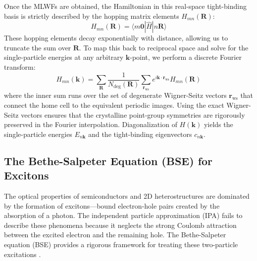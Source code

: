 \documentclass[11pt, a4paper]{article}
\begin{document}
Once the MLWFs are obtained, the Hamiltonian in this real-space tight-binding basis is strictly described by the hopping matrix elements $H_{mn}(\mathbf{R})$:
\begin{equation}
    H_{mn}(\mathbf{R}) = \langle m \mathbf{0} | \hat{H} | n \mathbf{R} \rangle
\end{equation}
These hopping elements decay exponentially with distance, allowing us to truncate the sum over $\mathbf{R}$. To map this back to reciprocal space and solve for the single-particle energies at any arbitrary $\mathbf{k}$-point, we perform a discrete Fourier transform:
\begin{equation}
    H_{mn}(\mathbf{k}) = \sum_{\mathbf{R}} \frac{1}{N_{\text{deg}}(\mathbf{R})} \sum_{\mathbf{r}_{\text{ws}}} e^{i \mathbf{k} \cdot \mathbf{r}_{\text{ws}}} H_{mn}(\mathbf{R})
\end{equation}
where the inner sum runs over the set of degenerate Wigner-Seitz vectors $\mathbf{r}_{\text{ws}}$ that connect the home cell to the equivalent periodic images. Using the exact Wigner-Seitz vectors ensures that the crystalline point-group symmetries are rigorously preserved in the Fourier interpolation. Diagonalization of $H(\mathbf{k})$ yields the single-particle energies $E_{n\mathbf{k}}$ and the tight-binding eigenvectors $c_{n\mathbf{k}}$.

\subsection{The Bethe-Salpeter Equation (BSE) for Excitons}
The optical properties of semiconductors and 2D heterostructures are dominated by the formation of excitons—bound electron-hole pairs created by the absorption of a photon. The independent particle approximation (IPA) fails to describe these phenomena because it neglects the strong Coulomb attraction between the excited electron and the remaining hole. The Bethe-Salpeter equation (BSE) provides a rigorous framework for treating these two-particle excitations \cite{rohlfing2000, haug_koch_2009}.
\end{document}
